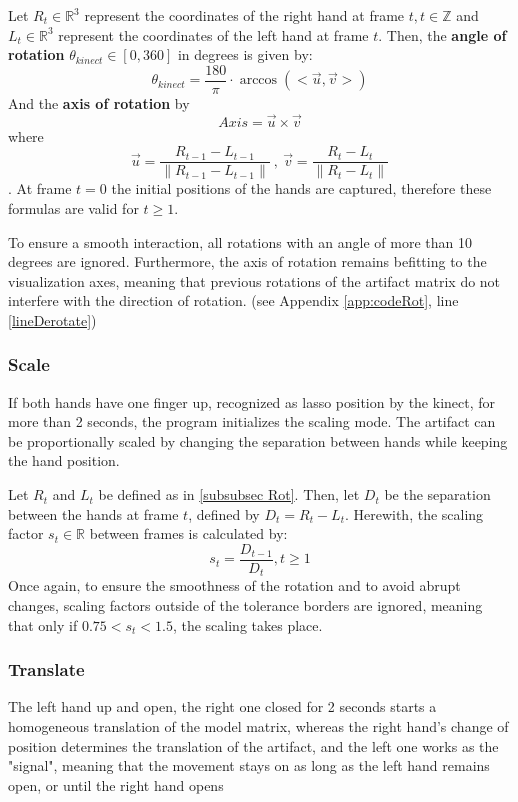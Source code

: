 \documentclass[12pt]{extarticle}
\newcommand{\R}{\mathbb{R}}
\newcommand{\Z}{\mathbb{Z}}
\begin{document}
\begin{appendices}
Let $R_t\in \R^3$ represent the coordinates of the right hand at frame $t, t\in \Z$ and $L_t\in\R^3$ represent the coordinates of the left hand at frame $t$. Then, the \textbf{angle of rotation }$\theta_{kinect}\in [0, 360]$ in degrees is given by:
\[\theta_{kinect}=\frac{180}{\pi}\cdot \arccos(<\overrightarrow{u}, \overrightarrow{v}>)\]
And the \textbf{axis of rotation} by
\[Axis=\overrightarrow{u}\times \overrightarrow{v}\]
where $$\overrightarrow{u}=\frac{R_{t-1}-L_{t-1}}{\|R_{t-1}-L_{t-1}\|}\ , \ \overrightarrow{v}=\frac{R_t-L_t}{\|R_t-L_t\|}$$.
At frame $t=0$ the initial positions of the hands are captured, therefore these formulas are valid for $t\geq 1$.

To ensure a smooth interaction, all rotations with an angle of more than 10 degrees are ignored. Furthermore, the axis of rotation remains befitting to the visualization axes, meaning that previous rotations of the artifact matrix do not interfere with the direction of rotation. (see Appendix \ref{app:codeRot}, line \ref{lineDerotate})

\subsubsection {Scale}\label{subsubsec Scale} If both hands have one finger up, recognized as lasso position by the kinect, for more than 2 seconds, the program initializes the scaling mode. The artifact can be proportionally scaled by changing the separation between hands while keeping the hand position.

Let $R_t$ and $L_t$ be defined as in \ref{subsubsec Rot}. Then, let $D_t$ be the separation between the hands at frame $t$, defined by $D_t=R_{t}-L_{t}$. Herewith, the scaling factor $s_t\in \R$ between frames is calculated by:
$$s_t=\frac{D_{t-1}}{D_t}, t\geq 1$$
Once again, to ensure the smoothness of the rotation and to avoid abrupt changes, scaling factors outside of the tolerance borders are ignored, meaning that only if $0.75<s_t<1.5$, the scaling takes place.


\subsubsection {Translate} The left hand up and open, the right one closed for 2 seconds starts a homogeneous translation of the model matrix, whereas the right hand's change of position determines the translation of the artifact, and the left one works as the "signal", meaning that the movement stays on as long as the left hand remains open, or until the right hand opens


\end{appendices}
\end{document}

